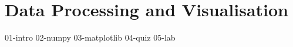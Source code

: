 \chapter{Data Processing and Visualisation}

{01-intro}
{02-numpy}
{03-matplotlib}
{04-quiz}
{05-lab}


